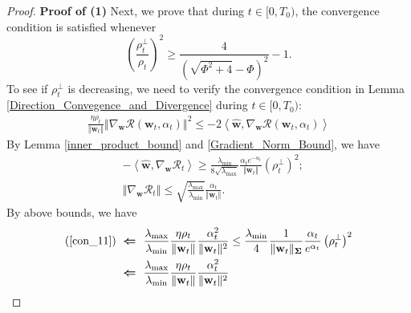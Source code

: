 \documentclass[pdflatex,sn-basic]{sn-jnl}%
\theoremstyle{thmstyleone}%
\begin{document}
\begin{appendices}
\begin{proof}
  \noindent \textbf{Proof of (1)}
  Next, we prove that during $t \in [0, T_0)$, the convergence condition is satisfied whenever
  \[
    \left(
      \frac{\rho_t^{\perp}}{\rho_t}
    \right)^2
    \ge
    \frac{4}{\left(\sqrt{ \Phi^2 + 4} - \Phi\right)^2} - 1.
  \]
  To see if $\rho_t^{\perp}$ is decreasing, we need to verify the convergence 
  condition in Lemma \ref{Direction_Convegence_and_Divergence} during $t \in [0, T_0)$:
  \begin{equation}\label{con_11}
  \begin{aligned}
    \frac{\eta {\rho}_{t}}{\Vert \mathbf{w}_{t} \Vert}
    \left\Vert
      \nabla_{\mathbf{w}} \mathcal{R} \left(\mathbf{w}_{t}, \alpha_{t}\right)
    \right\Vert^2
    \le 
    - 2
    \left\langle 
    \hat{\mathbf{w}},
    \nabla_{\mathbf{w}} \mathcal{R} \left(\mathbf{w}_{t}, \alpha_{t}\right)
    \right\rangle
  \end{aligned}
  \end{equation}
  By Lemma \ref{inner_product_bound} and \ref{Gradient_Norm_Bound}, we have
  \begin{equation*}
  \begin{aligned}
    & - \left\langle \hat{\mathbf{w}}, \nabla_{\mathbf{w}} \mathcal{R}_t\right\rangle 
    \ge 
    \frac{\lambda_{\min} }{8 \sqrt{\lambda_{\max} }}
    \frac{\alpha_t  e^{-\alpha_t }}{\Vert \mathbf{w}_t \Vert}
    \left( \rho_t^{\perp} \right)^2;
    \\ &
    \left\Vert 
    \nabla_{\mathbf{w}} \mathcal{R}_t
    \right\Vert
    \le 
    \sqrt{
      \frac{\lambda_{\max}}{\lambda_{\min}}
    }
    \frac{\alpha_t}{\Vert \mathbf{w}_t \Vert}.
  \end{aligned}
  \end{equation*}
  By above bounds, we have
  \begin{equation}\label{eq:positive_branch_descent_sufficient}
  \begin{aligned}
    (\ref{con_11})
    \ \boldsymbol{\Leftarrow} \ \ & 
    \frac{\lambda_{\max} }{\lambda_{\min} }
    \frac{\eta {\rho}_{t}}{\Vert \mathbf{w}_{t} \Vert}
    \frac{\alpha_t^2}{\Vert \mathbf{w}_t \Vert^{2} }
    \le 
    \frac{\lambda_{\min}}{4}
    \frac{1}{\Vert \mathbf{w}_{t} \Vert_{\mathbf{\Sigma}}}
    \frac{\alpha_{t}}{e^{\alpha_{t}}}
    \left(
      \rho_{t}^{\perp}
    \right)^2 
    \\ \ \boldsymbol{\Leftarrow} \ \ & 
    \frac{\lambda_{\max} }{\lambda_{\min} }
    \frac{\eta {\rho}_{t}}{\Vert \mathbf{w}_{t} \Vert}
    \frac{\alpha_t^2}{\Vert \mathbf{w}_t \Vert^{2} }

\end{aligned}
\end{equation}
\end{proof}
\end{appendices}
\end{document}
